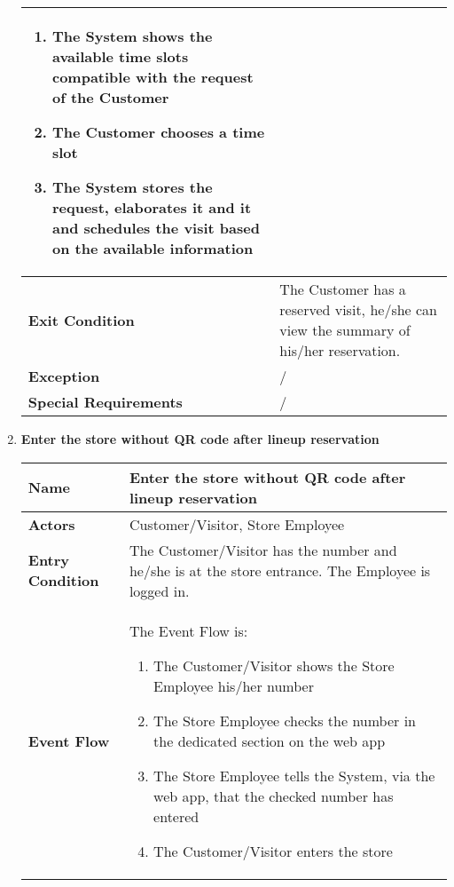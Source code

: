 \begin{enumerate}
{\begin{longtable}{|L{4cm}|L{10cm}|}
\begin{enumerate}
                        \item The System shows the available time slots compatible with the request of the Customer
                        \item The Customer chooses a time slot
                        \item The System stores the request, elaborates it and it and schedules the visit based on the available information
                    \end{enumerate} \\
                \hline
                \textbf{Exit Condition} & The Customer has a reserved visit, he/she can view the summary of his/her reservation. \\
                \hline
                \textbf{Exception} & / \\
                \hline
                \textbf{Special Requirements} & / \\
                \hline
            \end{longtable}}
            \item \textbf{Enter the store without QR code after lineup reservation}{\renewcommand{\arraystretch}{2}
            \begin{longtable}{|L{4cm}|L{10cm}|}
                \hline
                \textbf{Name} & Enter the store without QR code after lineup reservation \\
                \hline
                \textbf{Actors} & Customer/Visitor, Store Employee \\
                \hline
                \textbf{Entry Condition} & The Customer/Visitor has the number and he/she is at the store entrance. The Employee is logged in. \\
                \hline
                \textbf{Event Flow} & The Event Flow is: \begin{enumerate}
                        \item The Customer/Visitor shows the Store Employee his/her number
                        \item The Store Employee checks the number in the dedicated section on the web app
                        \item The Store Employee tells the System, via the web app, that the checked number has entered
                        \item The Customer/Visitor enters the store
                    \end{enumerate} \\

\end{longtable}}
\end{enumerate}
